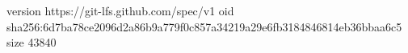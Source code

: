 version https://git-lfs.github.com/spec/v1
oid sha256:6d7ba78ce2096d2a86b9a779f0c857a34219a29e6fb3184846814eb36bbaa6c5
size 43840
